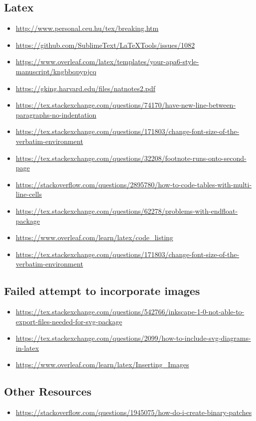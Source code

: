 \documentclass[a4paper,man,natbib,floatsintext]{apa6}
\begin{document}
  \subsection{Latex}
  \begin{itemize}
    \item \url{http://www.personal.ceu.hu/tex/breaking.htm}
    \item \url{https://github.com/SublimeText/LaTeXTools/issues/1082}
    \item \url{https://www.overleaf.com/latex/templates/your-apa6-style-manuscript/kngbbqpypjcq}
    \item \url{https://gking.harvard.edu/files/natnotes2.pdf}
    \item \url{https://tex.stackexchange.com/questions/74170/have-new-line-between-paragraphs-no-indentation}
    \item \url{https://tex.stackexchange.com/questions/171803/change-font-size-of-the-verbatim-environment}
    \item \url{https://tex.stackexchange.com/questions/32208/footnote-runs-onto-second-page}
    \item \url{https://stackoverflow.com/questions/2895780/how-to-code-tables-with-multi-line-cells}
    \item \url{https://tex.stackexchange.com/questions/62278/problems-with-endfloat-package}
    \item \url{https://www.overleaf.com/learn/latex/code_listing}
    \item \url{https://tex.stackexchange.com/questions/171803/change-font-size-of-the-verbatim-environment}
  \end{itemize}

  \subsection{Failed attempt to incorporate images}
  \begin{itemize}
    \item \url{https://tex.stackexchange.com/questions/542766/inkscape-1-0-not-able-to-export-files-needed-for-svg-package}
    \item \url{https://tex.stackexchange.com/questions/2099/how-to-include-svg-diagrams-in-latex}
    \item \url{https://www.overleaf.com/learn/latex/Inserting_Images}
  \end{itemize}

  \subsection{Other Resources}
  \begin{itemize}
    \item \url{https://stackoverflow.com/questions/1945075/how-do-i-create-binary-patches}
  \end{itemize}
\end{document}
